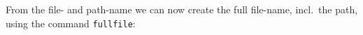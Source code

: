 From the file- and path-name we can now create the full file-name, incl.\ the path, using the command \lstinline{fullfile}: